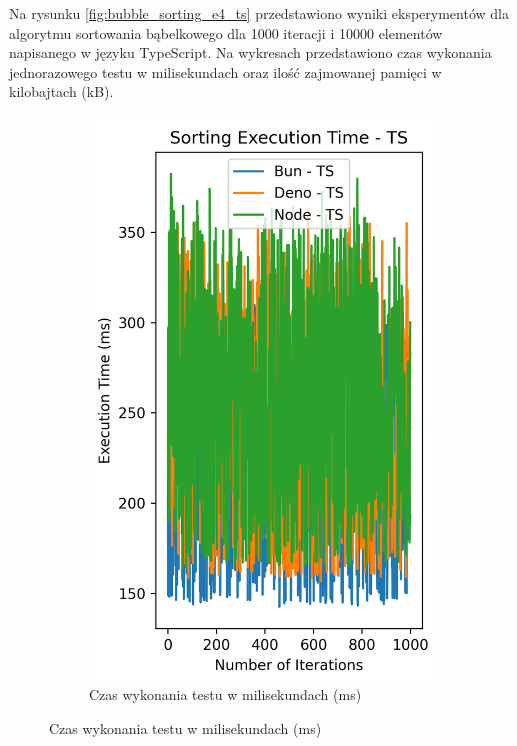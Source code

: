 Na rysunku \ref{fig:bubble_sorting_e4_ts} przedstawiono wyniki eksperymentów dla algorytmu sortowania bąbelkowego dla 1000 iteracji i 10000 elementów napisanego w języku TypeScript. Na wykresach przedstawiono czas wykonania jednorazowego testu w milisekundach oraz ilość zajmowanej pamięci w kilobajtach (kB).

\begin{figure}[H]
  \centering
  \begin{subfigure}[b]{0.44\textwidth}
    \centering
    \includegraphics[width=\textwidth]{Figures/sorting/sorting_bubble_1000_10000_ts_time.png}
    \caption{Czas wykonania testu w milisekundach (ms)}

\end{subfigure}
\end{figure}
